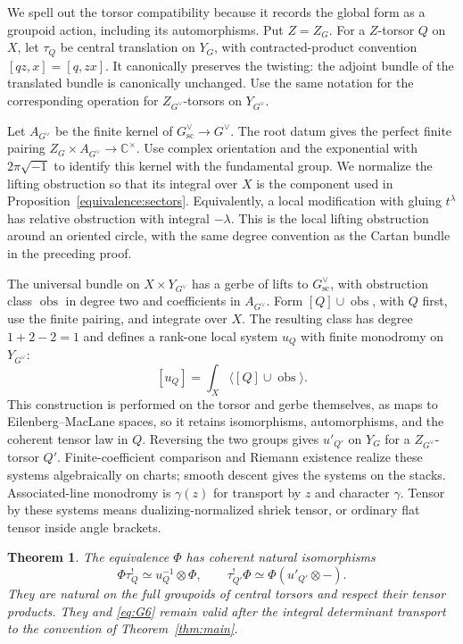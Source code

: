 \documentclass[11pt]{article}
\numberwithin{equation}{section}
\newtheorem{theorem}{Theorem}[section]
\theoremstyle{definition}
\theoremstyle{remark}
\begin{document}
We spell out the torsor compatibility because it records the global
form as a groupoid action, including its automorphisms.  Put \(Z=Z_G\).
For a \(Z\)-torsor \(Q\) on \(X\), let \(\tau_Q\) be central
translation on \(Y_G\), with contracted-product convention
\([qz,x]=[q,zx]\).  It canonically preserves the twisting: the
adjoint bundle of the translated bundle is canonically unchanged.
Use the same notation for the corresponding operation for
\(Z_{G^\vee}\)-torsors on \(Y_{G^\vee}\).

Let \(A_{G^\vee}\) be the finite kernel of
\(G^\vee_{\mathrm{sc}}\to G^\vee\).  The root datum gives the
perfect finite pairing
\(Z_G\times A_{G^\vee}\to\mathbb C^\times\).  Use complex
orientation and the exponential with \(2\pi\sqrt{-1}\) to identify
this kernel with the fundamental group.  We normalize the lifting
obstruction so that its integral over \(X\) is the component used in
Proposition~\ref{equivalence:sectors}.  Equivalently, a local
modification with gluing \(t^\lambda\) has relative obstruction
with integral \(-\lambda\).  This is the local lifting obstruction
around an oriented circle, with the same degree convention as the
Cartan bundle in the preceding proof.

The universal bundle on \(X\times Y_{G^\vee}\) has a gerbe of lifts
to \(G^\vee_{\mathrm{sc}}\), with obstruction class
\(\operatorname{obs}\) in degree two and coefficients in
\(A_{G^\vee}\).  Form \([Q]\cup\operatorname{obs}\), with
\(Q\) first, use the finite pairing, and integrate over \(X\).
The resulting class has degree \(1+2-2=1\) and defines a rank-one
local system \(u_Q\) with finite monodromy on \(Y_{G^\vee}\):
\[
 [u_Q]=\int_X\bigl\langle[Q]\cup\operatorname{obs}\bigr\rangle.
\]
This construction is performed on the
torsor and gerbe themselves, as maps to Eilenberg--MacLane spaces,
so it retains isomorphisms, automorphisms, and the coherent tensor law
in \(Q\).  Reversing the two groups gives \(u'_{Q'}\) on \(Y_G\)
for a \(Z_{G^\vee}\)-torsor \(Q'\).  Finite-coefficient comparison
and Riemann existence realize these systems algebraically on charts;
smooth descent gives the systems on the stacks.  Associated-line
monodromy is \(\gamma(z)\) for transport by \(z\) and character
\(\gamma\).  Tensor by these systems means dualizing-normalized
shriek tensor, or ordinary flat tensor inside angle brackets.

\begin{theorem}\label{equivalence:central}
The equivalence \(\Phi\) has coherent natural isomorphisms
\begin{equation}\label{eq:G7}
 \Phi\tau_Q^!\simeq u_Q^{-1}\otimes\Phi,
 \qquad
 \tau_{Q'}^!\Phi\simeq\Phi(u'_{Q'}\otimes-).
\end{equation}
They are natural on the full groupoids of central torsors and respect
their tensor products.  They and \eqref{eq:G6} remain valid after the
integral determinant transport to the convention of
Theorem~\ref{thm:main}.
\end{theorem}
\end{document}
